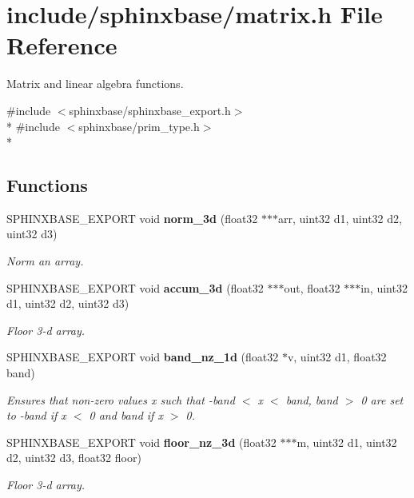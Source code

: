 \section{include/sphinxbase/matrix.h File Reference}
\label{matrix_8h}


Matrix and linear algebra functions.  


{\ttfamily \#include $<$sphinxbase/sphinxbase\-\_\-export.\-h$>$}\\*
{\ttfamily \#include $<$sphinxbase/prim\-\_\-type.\-h$>$}\\*
\subsection*{Functions}
\begin{DoxyCompactItemize}
\item 
S\-P\-H\-I\-N\-X\-B\-A\-S\-E\-\_\-\-E\-X\-P\-O\-R\-T void {\bf norm\-\_\-3d} (float32 $\ast$$\ast$$\ast$arr, uint32 d1, uint32 d2, uint32 d3)
\begin{DoxyCompactList}\small\item\em Norm an array. \end{DoxyCompactList}\item 
S\-P\-H\-I\-N\-X\-B\-A\-S\-E\-\_\-\-E\-X\-P\-O\-R\-T void {\bf accum\-\_\-3d} (float32 $\ast$$\ast$$\ast$out, float32 $\ast$$\ast$$\ast$in, uint32 d1, uint32 d2, uint32 d3)
\begin{DoxyCompactList}\small\item\em Floor 3-\/d array. \end{DoxyCompactList}\item 
S\-P\-H\-I\-N\-X\-B\-A\-S\-E\-\_\-\-E\-X\-P\-O\-R\-T void {\bf band\-\_\-nz\-\_\-1d} (float32 $\ast$v, uint32 d1, float32 band)
\begin{DoxyCompactList}\small\item\em Ensures that non-\/zero values x such that -\/band $<$ x $<$ band, band $>$ 0 are set to -\/band if x $<$ 0 and band if x $>$ 0. \end{DoxyCompactList}\item 
S\-P\-H\-I\-N\-X\-B\-A\-S\-E\-\_\-\-E\-X\-P\-O\-R\-T void {\bf floor\-\_\-nz\-\_\-3d} (float32 $\ast$$\ast$$\ast$m, uint32 d1, uint32 d2, uint32 d3, float32 floor)
\begin{DoxyCompactList}\small\item\em Floor 3-\/d array. \end{DoxyCompactList}\item 

\end{DoxyCompactItemize}
